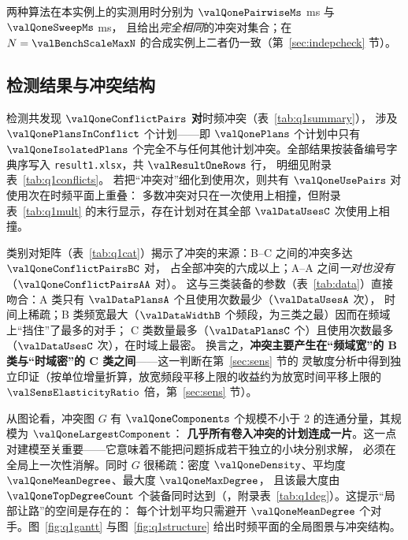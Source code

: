 两种算法在本实例上的实测用时分别为 $\valQonePairwiseMs$ ms 与 $\valQoneSweepMs$ ms，
且给出\emph{完全相同}的冲突对集合；在 $N=\valBenchScaleMaxN$ 的合成实例上二者仍一致（第~\ref{sec:indepcheck} 节）。

\subsection{检测结果与冲突结构}

\begin{table}[htbp]
\centering\small
\begin{minipage}[t]{0.54\linewidth}
\centering
\caption{问题 1 的冲突统计摘要。}\label{tab:q1summary}
\resizebox{\linewidth}{!}{}
\end{minipage}\hfill
\begin{minipage}[t]{0.42\linewidth}
\centering
\caption{按装备类别对统计的冲突对数（对称矩阵，对角线为同类内部的冲突对）。}\label{tab:q1cat}

\end{minipage}
\end{table}

检测共发现 $\boldsymbol{\valQoneConflictPairs}$ \textbf{对}时频冲突（表~\ref{tab:q1summary}），
涉及 $\valQonePlansInConflict$ 个计划——即 $\valQonePlans$ 个计划中只有
$\valQoneIsolatedPlans$ 个完全不与任何其他计划冲突。全部结果按装备编号字典序写入 \nolinkurl{result1.xlsx}，共 $\valResultOneRows$ 行，
明细见附录表~\ref{tab:q1conflicts}。
若把“冲突对”细化到使用次，则共有 $\valQoneUsePairs$ 对使用次在时频平面上重叠：
多数冲突对只在一次使用上相撞，但附录表~\ref{tab:q1mult} 的末行显示，存在计划对在其全部 $\valDataUsesC$ 次使用上相撞。

类别对矩阵（表~\ref{tab:q1cat}）揭示了冲突的来源：B--C 之间的冲突多达 $\valQoneConflictPairsBC$ 对，
占全部冲突的六成以上；A--A 之间\emph{一对也没有}（$\valQoneConflictPairsAA$ 对）。
这与三类装备的参数（表~\ref{tab:data}）直接吻合：A 类只有 $\valDataPlansA$ 个且使用次数最少（$\valDataUsesA$ 次），
时间上稀疏；B 类频宽最大（$\valDataWidthB$ 个频段，为三类之最）因而在频域上“挡住”了最多的对手；
C 类数量最多（$\valDataPlansC$ 个）且使用次数最多（$\valDataUsesC$ 次），在时域上最密。
换言之，\textbf{冲突主要产生在“频域宽”的 B 类与“时域密”的 C 类之间}——这一判断在第~\ref{sec:sens} 节的
灵敏度分析中得到独立印证（按单位增量折算，放宽频段平移上限的收益约为放宽时间平移上限的 $\valSensElasticityRatio$ 倍，第~\ref{sec:sens} 节）。

从图论看，冲突图 $G$ 有 $\valQoneComponents$ 个规模不小于 $2$ 的连通分量，其规模为 $\valQoneLargestComponent$：
\textbf{几乎所有卷入冲突的计划连成一片}。这一点对建模至关重要——它意味着不能把问题拆成若干独立的小块分别求解，
必须在全局上一次性消解。同时 $G$ 很稀疏：密度 $\valQoneDensity$、平均度 $\valQoneMeanDegree$、最大度 $\valQoneMaxDegree$，
且该最大度由 $\valQoneTopDegreeCount$ 个装备同时达到（\valQoneTopDegreeIds{}，附录表~\ref{tab:q1deg}）。这提示“局部让路”的空间是存在的：
每个计划平均只需避开 $\valQoneMeanDegree$ 个对手。图~\ref{fig:q1gantt} 与图~\ref{fig:q1structure} 给出时频平面的全局图景与冲突结构。

